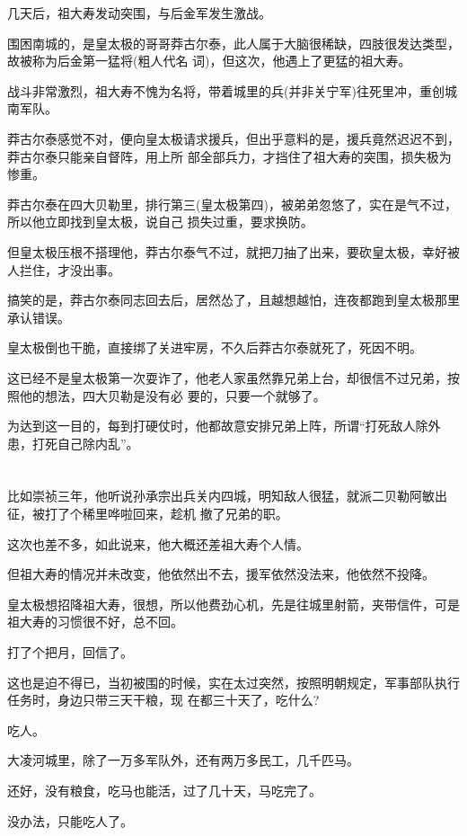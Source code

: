 \documentclass[11pt,a4paper,onecolumn]{article}
\begin{document}
几天后，祖大寿发动突围，与后金军发生激战。

围困南城的，是皇太极的哥哥莽古尔泰，此人属于大脑很稀缺，四肢很发达类型，故被称为后金第一猛将(粗人代名
词)，但这次，他遇上了更猛的祖大寿。

战斗非常激烈，祖大寿不愧为名将，带着城里的兵(并非关宁军)往死里冲，重创城南军队。

莽古尔泰感觉不对，便向皇太极请求援兵，但出乎意料的是，援兵竟然迟迟不到，莽古尔泰只能亲自督阵，用上所
部全部兵力，才挡住了祖大寿的突围，损失极为惨重。

莽古尔泰在四大贝勒里，排行第三(皇太极第四)，被弟弟忽悠了，实在是气不过，所以他立即找到皇太极，说自己
损失过重，要求换防。

但皇太极压根不搭理他，莽古尔泰气不过，就把刀抽了出来，要砍皇太极，幸好被人拦住，才没出事。

搞笑的是，莽古尔泰同志回去后，居然怂了，且越想越怕，连夜都跑到皇太极那里承认错误。

皇太极倒也干脆，直接绑了关进牢房，不久后莽古尔泰就死了，死因不明。

这已经不是皇太极第一次耍诈了，他老人家虽然靠兄弟上台，却很信不过兄弟，按照他的想法，四大贝勒是没有必
要的，只要一个就够了。

为达到这一目的，每到打硬仗时，他都故意安排兄弟上阵，所谓``打死敌人除外患，打死自己除内乱''。

\section[\thesection]{}

比如崇祯三年，他听说孙承宗出兵关内四城，明知敌人很猛，就派二贝勒阿敏出征，被打了个稀里哗啦回来，趁机
撤了兄弟的职。

这次也差不多，如此说来，他大概还差祖大寿个人情。

但祖大寿的情况并未改变，他依然出不去，援军依然没法来，他依然不投降。

皇太极想招降祖大寿，很想，所以他费劲心机，先是往城里射箭，夹带信件，可是祖大寿的习惯很不好，总不回。

打了个把月，回信了。

这也是迫不得已，当初被围的时候，实在太过突然，按照明朝规定，军事部队执行任务时，身边只带三天干粮，现
在都三十天了，吃什么?

吃人。

大凌河城里，除了一万多军队外，还有两万多民工，几千匹马。

还好，没有粮食，吃马也能活，过了几十天，马吃完了。

没办法，只能吃人了。
\end{document}
